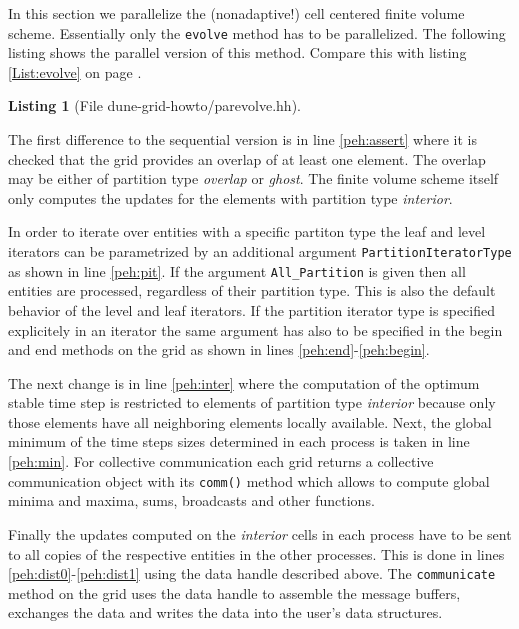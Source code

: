 \documentclass[11pt,a4paper,headinclude,footinclude,DIV16,normalheadings]{scrreprt}
\newtheorem{lst}{Listing}
\begin{document}
In this section we parallelize the (nonadaptive!) cell centered finite volume
scheme. Essentially only the \lstinline!evolve! method has to be
parallelized. The following listing shows the parallel version of this
method. Compare this with listing \ref{List:evolve} on page \pageref{List:evolve}.

\begin{lst}[File dune-grid-howto/parevolve.hh] \mbox{}
\nopagebreak

\end{lst}

The first difference to the sequential version is in line
\ref{peh:assert} where it is checked that the grid provides an overlap
of at least one element. The overlap may be either of partition type
\textit{overlap} or \textit{ghost}. The finite volume scheme itself
only computes the updates for the elements with partition type
\textit{interior}.

In order to iterate over entities with a specific partiton type the
leaf and level iterators can be parametrized by an additional argument
\lstinline!PartitionIteratorType! as shown in line \ref{peh:pit}. If
the argument \lstinline!All_Partition! is given then all entities are
processed, regardless of their partition type. This is also the
default behavior of the level and leaf iterators. If the partition
iterator type is specified explicitely in an iterator the same
argument has also to be specified in the begin and end methods on the
grid as shown in lines \ref{peh:end}-\ref{peh:begin}.

The next change is in line \ref{peh:inter} where the computation of
the optimum stable time step is restricted to elements of partition
type \textit{interior} because only those elements have all neighboring
elements locally available. Next, the global minimum of the time steps
sizes determined in each process is taken in line \ref{peh:min}. For
collective communication each grid returns a collective communication
object with its \lstinline!comm()! method which allows to compute
global minima and maxima, sums, broadcasts and other functions.

Finally the updates computed on the \textit{interior} cells in each
process have to be sent to all copies of the respective entities in
the other processes. This is done in lines
\ref{peh:dist0}-\ref{peh:dist1} using the data handle described above.
The \lstinline!communicate! method on the grid uses the data handle to
assemble the message buffers, exchanges the data and writes the data
into the user's data structures.
\end{document}
